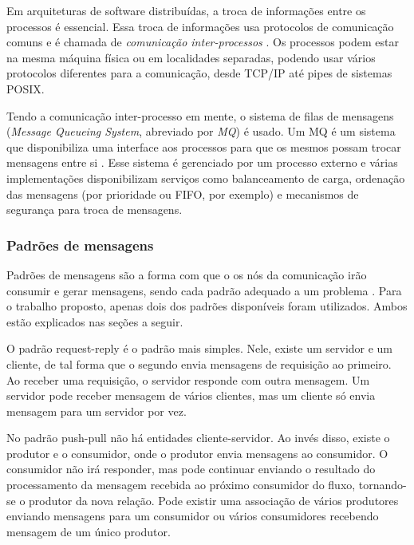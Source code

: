 Em arquiteturas de software distribuídas, a troca de informações entre
os processos é essencial. Essa troca de informações usa protocolos de
comunicação comuns e é chamada de \textit{comunicação inter-processos}
\cite{wikiipc}. Os processos podem estar na mesma máquina física ou em
localidades separadas, podendo usar vários protocolos diferentes para
a comunicação, desde TCP/IP até pipes de sistemas POSIX.

Tendo a comunicação inter-processo em mente, o sistema de filas de
mensagens (\textit{Message Queueing System}, abreviado por
\textit{MQ}) é usado. Um MQ é um sistema que disponibiliza uma
interface aos processos para que os mesmos possam trocar mensagens
entre si \cite{feldbaum2002method}. Esse sistema é gerenciado por um
processo externo e várias implementações disponibilizam serviços como
balanceamento de carga, ordenação das mensagens (por prioridade ou
FIFO, por exemplo) e mecanismos de segurança para troca de mensagens.

\subsubsection{Padrões de mensagens}
Padrões de mensagens são a forma com que o os nós da comunicação irão
consumir e gerar mensagens, sendo cada padrão adequado a um problema
\cite{zmq}. Para o trabalho proposto, apenas dois dos padrões
disponíveis foram utilizados. Ambos estão explicados nas seções a
seguir.


O padrão request-reply é o padrão mais simples. Nele, existe um
servidor e um cliente, de tal forma que o segundo envia mensagens de
requisição ao primeiro. Ao receber uma requisição, o servidor responde
com outra mensagem. Um servidor pode receber mensagem de vários
clientes, mas um cliente só envia mensagem para um servidor por vez.


No padrão push-pull não há entidades cliente-servidor. Ao invés disso,
existe o produtor e o consumidor, onde o produtor envia mensagens ao
consumidor. O consumidor não irá responder, mas pode continuar
enviando o resultado do processamento da mensagem recebida ao próximo
consumidor do fluxo, tornando-se o produtor da nova relação. Pode
existir uma associação de vários produtores enviando mensagens para um
consumidor ou vários consumidores recebendo mensagem de um único
produtor.
